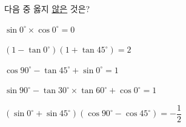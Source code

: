 다음 중 옳지 \underline{않은} 것은?
\begin{choicesv}{\rule[-3ex]{0pt}{8ex}$\sin 0^\circ\times\cos 0^\circ=0$}{\rule[-3ex]{0pt}{8ex}$(1-\tan 0^\circ)(1+\tan 45^\circ)=2$}{\rule[-3ex]{0pt}{8ex}$\cos 90^\circ-\tan 45^\circ+\sin 0^\circ=1$}{\rule[-3ex]{0pt}{8ex}$\sin 90^\circ-\tan 30^\circ\times\tan 60^\circ+\cos 0^\circ=1$}{\rule[-3ex]{0pt}{8ex}$(\sin 0^\circ+\sin 45^\circ)(\cos 90^\circ-\cos 45^\circ)=-\dfrac{1}{2}$}\end{choicesv}
